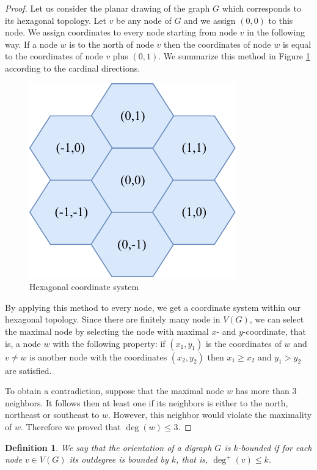 \documentclass[a4paper, 12pt]{article}
\newtheorem{defin}[lem]{Definition}
\begin{document}
\begin{proof} Let us consider the planar drawing of the graph $G$ which corresponds to its hexagonal topology.
Let $v$ be any node of $G$ and we assign $(0,0)$ to this node. We assign coordinates to every node starting from node $v$ in the following way. If a node $w$ is to the north of node $v$ then the coordinates of node $w$ is equal to the coordinates of node $v$ plus $(0,1)$. We summarize this method in Figure \ref{fig:assignment} according to the cardinal directions.
\begin{figure}[!h]
\centering
\includegraphics[scale=1]{figures/hexagonal-coordinate-system.pdf}
\caption{Hexagonal coordinate system}\label{fig:assignment}
\end{figure}
By applying this method to every node, we get a coordinate system within our hexagonal topology. Since there are finitely many node in $V(G)$, we can select the maximal node by selecting the node with maximal $x$- and $y$-coordinate, that is, a node $w$ with the following property: if $(x_1,y_1)$ is the coordinates of $w$ and $v \neq w$ is another node with the coordinates $(x_2,y_2)$ then $x_1 \geqslant x_2$ and $y_1 > y_2$ are satisfied.

To obtain a contradiction, suppose that the maximal node $w$ has more than 3 neighbors. It follows then at least one if its neighbors is either to the north, northeast or southeast to $w$. However, this neighbor would violate the maximality of $w$. Therefore we proved that $\deg(w) \leqslant 3$.
\end{proof}
\begin{defin}
We say that the orientation of a digraph $G$ is $k$\textit{-bounded} if for each node $v \in V(G)$ its outdegree is bounded by $k$, that is, $\deg^+(v) \leqslant k$.
\end{defin}
\end{document}
